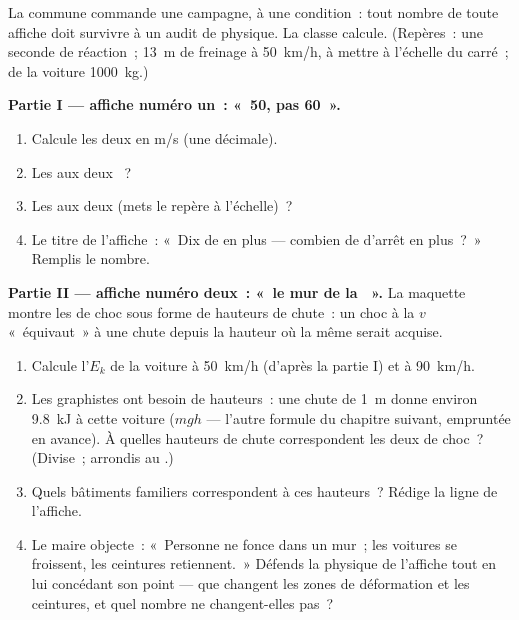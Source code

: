 \begin{problem}\label{pb:g9:kinetic-energy-safety:1}
La commune commande une campagne, à une condition~: tout nombre de
toute affiche doit survivre à un audit de physique. La classe calcule.
(Repères~: une seconde de réaction~; \qty{13}{m} de freinage à
\qty{50}{km/h}, à mettre à l'échelle du carré~;  de la voiture
\qty{1000}{kg}.)

\medskip\noindent\textbf{Partie I --- affiche numéro un~: «~50, pas
60~».}
\begin{enumerate}
  \item Calcule les deux  en \unit{m/s} (une décimale).
  \item Les  aux deux ~?
  \item Les  aux deux (mets le repère à
        l'échelle)~?
  \item Le titre de l'affiche~: «~Dix  de  en plus ---
        combien de  d'arrêt en plus~?~» Remplis le nombre.
\end{enumerate}

\medskip\noindent\textbf{Partie II --- affiche numéro deux~: «~le
mur de la ~».}
La maquette montre les  de choc sous forme de hauteurs de
chute~: un choc à la  $v$ «~équivaut~» à une chute depuis la
hauteur où la même  serait acquise.
\begin{enumerate}[resume]
  \item Calcule l'$E_k$ de la voiture à \qty{50}{km/h} (d'après la
        partie I) et à \qty{90}{km/h}.
  \item Les graphistes ont besoin de hauteurs~: une chute de
        \qty{1}{m} donne environ \qty{9.8}{kJ} à cette voiture
        ($m g h$ --- l'autre formule du chapitre suivant, empruntée
        en avance). À quelles hauteurs de chute correspondent les
        deux  de choc~? (Divise~; arrondis au .)
  \item Quels bâtiments familiers correspondent à ces hauteurs~?
        Rédige la ligne de l'affiche.
  \item Le maire objecte~: «~Personne ne fonce dans un mur~; les
        voitures se froissent, les ceintures retiennent.~» Défends
        la physique de l'affiche tout en lui concédant son point
        --- que changent les zones de déformation et les
        ceintures, et quel nombre ne changent-elles pas~?
\end{enumerate}


\end{problem}
